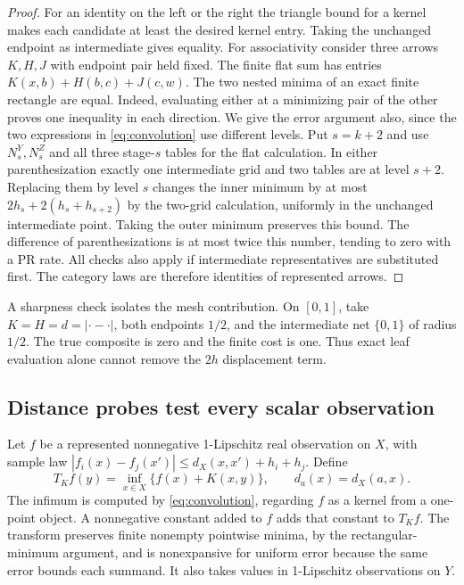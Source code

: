 \begin{proof}
For an identity on the left or the right the triangle bound for a kernel makes each candidate at least the desired kernel entry. Taking the unchanged endpoint as intermediate gives equality. For associativity consider three arrows \(K,H,J\) with endpoint pair held fixed. The finite flat sum has entries \(K(x,b)+H(b,c)+J(c,w)\). The two nested minima of an exact finite rectangle are equal. Indeed, evaluating either at a minimizing pair of the other proves one inequality in each direction. We give the error argument also, since the two expressions in \eqref{eq:convolution} use different levels. Put \(s=k+2\) and use \(N_s^Y,N_s^Z\) and all three stage-\(s\) tables for the flat calculation. In either parenthesization exactly one intermediate grid and two tables are at level \(s+2\). Replacing them by level \(s\) changes the inner minimum by at most \(2h_s+2(h_s+h_{s+2})\) by the two-grid calculation, uniformly in the unchanged intermediate point. Taking the outer minimum preserves this bound. The difference of parenthesizations is at most twice this number, tending to zero with a PR rate. All checks also apply if intermediate representatives are substituted first. The category laws are therefore identities of represented arrows.
\end{proof}

A sharpness check isolates the mesh contribution. On \([0,1]\), take \(K=H=d=|\cdot-\cdot|\), both endpoints \(1/2\), and the intermediate net \(\{0,1\}\) of radius \(1/2\). The true composite is zero and the finite cost is one. Thus exact leaf evaluation alone cannot remove the \(2h\) displacement term.

\subsection{Distance probes test every scalar observation}

Let \(f\) be a represented nonnegative 1-Lipschitz real observation on \(X\), with sample law \(|f_i(x)-f_j(x')|\le d_X(x,x')+h_i+h_j\). Define
\[
 T_K f(y)=\inf_{x\in X}\{ f(x)+K(x,y)\},\qquad d_a(x)=d_X(a,x).
\]
The infimum is computed by \eqref{eq:convolution}, regarding \(f\) as a kernel from a one-point object. A nonnegative constant added to \(f\) adds that constant to \(T_K f\). The transform preserves finite nonempty pointwise minima, by the rectangular-minimum argument, and is nonexpansive for uniform error because the same error bounds each summand. It also takes values in 1-Lipschitz observations on \(Y\).

